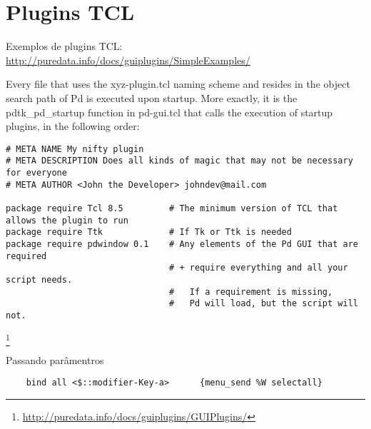 \chapter{Plugins TCL}
Exemplos de plugins TCL: \url{http://puredata.info/docs/guiplugins/SimpleExamples/}

Every file that uses the xyz-plugin.tcl naming scheme and resides in the object search path of Pd is executed upon startup. More exactly, it is the pdtk\_pd\_startup function in pd-gui.tcl that calls the execution of startup plugins, in the following order:


\begin{lstlisting}
# META NAME My nifty plugin
# META DESCRIPTION Does all kinds of magic that may not be necessary for everyone
# META AUTHOR <John the Developer> johndev@mail.com

package require Tcl 8.5         # The minimum version of TCL that allows the plugin to run
package require Ttk             # If Tk or Ttk is needed
package require pdwindow 0.1    # Any elements of the Pd GUI that are required
                                # + require everything and all your script needs.
                                #   If a requirement is missing,
                                #   Pd will load, but the script will not.
\end{lstlisting}
\footnote{\url{http://puredata.info/docs/guiplugins/GUIPlugins/}}


Passando parâmentros

\begin{lstlisting}
    bind all <$::modifier-Key-a>      {menu_send %W selectall}
\end{lstlisting}



